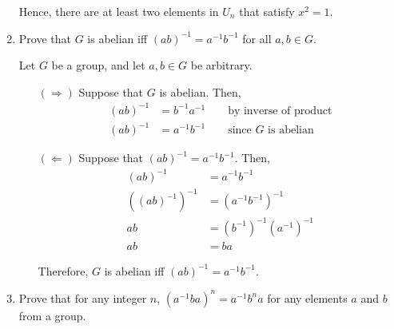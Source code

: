 \begin{example}[Seatwork]
\begin{enumerate}
            Hence, there are at least two elements in \(U_n\) that satisfy \(x^2 = 1\).

            \item Prove that \(G\) is abelian iff \((ab)^{-1} = a^{-1}b^{-1}\) for all \(a, b\in G\).

            Let \(G\) be a group, and let \(a, b\in G\) be arbitrary.
            \begin{itemize}
                \item[\((\Rightarrow)\)] Suppose that \(G\) is abelian. Then,
                \begin{align*}
                    (ab)^{-1} &= b^{-1}a^{-1}\qquad \text{by inverse of product} \\
                    (ab)^{-1} &= a^{-1}b^{-1}\qquad \text{since } G\text{ is abelian}
                \end{align*}

                \item[\((\Leftarrow)\)] Suppose that \((ab)^{-1} = a^{-1}b^{-1}\). Then,
                \begin{align*}
                    (ab)^{-1} &= a^{-1}b^{-1} \\
                    \left((ab)^{-1}\right)^{-1} &= (a^{-1}b^{-1})^{-1} \\
                    ab &= (b^{-1})^{-1}(a^{-1})^{-1} \\
                    ab &= ba
                \end{align*}

                Therefore, \(G\) is abelian iff \((ab)^{-1} = a^{-1}b^{-1}\).
            \end{itemize}

            \item Prove that for any integer \(n\), \((a^{-1}ba)^{n} = a^{-1}b^n a\) for any elements \(a\) and \(b\) from a group.


\end{enumerate}
\end{example}

